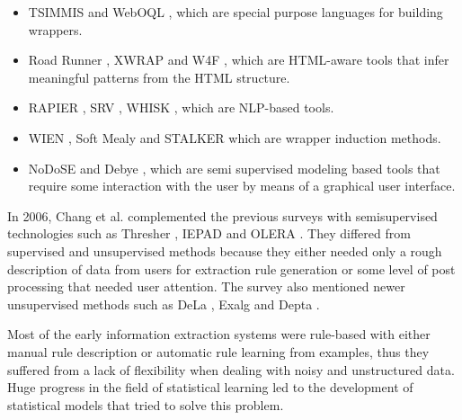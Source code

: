 \documentclass[sigconf]{acmart}
\begin{document}
\begin{itemize}
\item TSIMMIS \cite{Hammer1997} and WebOQL \cite{Arocena1999}, which are special purpose 
languages for building wrappers.

\item Road Runner \cite{Crescenzi2001}, XWRAP \cite{Liu2000} and W4F \cite{Sahuguet1999}, 
which are HTML-aware tools that infer meaningful patterns from the HTML structure.

\item RAPIER \cite{Califf1999}, SRV \cite{Freitag1998}, WHISK \cite{Soderland1999}, which 
are NLP-based tools.

\item WIEN \cite{Kushmerick2000}, Soft Mealy \cite{Hsu1998} and STALKER \cite{Muslea1999} which 
are wrapper induction methods.

\item NoDoSE \cite{Adelberg1998} and Debye \cite{Laender2002a}, which are semi supervised modeling
based tools that require some interaction with the user by means of a graphical
user interface.
\end{itemize}

In 2006, Chang et al. \cite{Chang2006} complemented the previous surveys with semisupervised 
technologies such as Thresher \cite{Hogue2005}, IEPAD \cite{Chang2001} and 
OLERA \cite{Chang2004}. They differed from supervised 
and unsupervised methods because they either needed only a rough description of
data from users for extraction rule generation or some level of post processing
that needed user attention. The survey also mentioned newer unsupervised methods
such as DeLa \cite{Wang2003}, Exalg \cite{Arasu2003} and Depta \cite{Zhai2005}.

Most of the early information extraction systems were rule-based with either 
manual rule description or automatic rule learning from examples, thus they
suffered from a lack of flexibility when dealing with noisy and unstructured data.
Huge progress in the field of statistical learning led to the development of
statistical models that tried to solve this problem.
\end{document}
